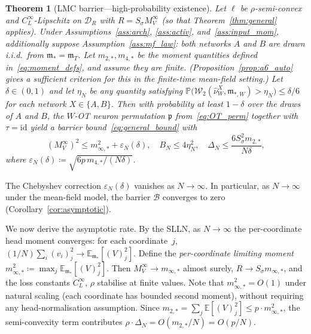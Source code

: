 \documentclass[11pt]{article}
\newtheorem{theorem}{Theorem}[section]
\newcommand{\E}{\mathbb{E}}
\newcommand{\Prob}{\mathbb{P}}
\newcommand{\cW}{\mathcal{W}}
\newcommand{\cB}{\mathcal{B}}
\newcommand{\cD}{\mathcal{D}}  %
\newcommand{\nperm}{\mathfrak{p}}  %
\begin{document}
\begin{theorem}[LMC barrier---high-probability existence]\label{thm:hp}
Let $\ell$ be $\rho$-semi-convex and $C_L^\infty$-Lipschitz on
$\cD_R$ with $R = S_\sigma M_V^\infty$ (so that
Theorem~\ref{thm:general} applies).
Under Assumptions~\ref{ass:arch}, \ref{ass:activ},
and~\ref{ass:input_mom}, additionally suppose
Assumption~\ref{ass:mf_law}: both networks $A$ and $B$ are
drawn i.i.d.\ from $\mathfrak{m}_* = \mathfrak{m}_T$.
Let $m_{2,*}, m_{4,*}$ be the moment quantities
defined in~\eqref{eq:moment_defs}, and assume they are finite.
(Proposition~\ref{prop:a6_auto} gives a sufficient criterion
for this in the finite-time mean-field setting.)
Let $\delta \in (0,1)$ and let $\eta_N$ be any quantity satisfying
$\Prob\!\bigl(\cW_2(\hat\nu_W^X, \mathfrak{m}_{*,W}) > \eta_N\bigr)
\le \delta/6$ for each network $X \in \{A,B\}$.
Then with probability at least $1-\delta$
over the draws of $A$ and $B$, the $W$-OT neuron permutation $\nperm$
from~\eqref{eq:OT_perm} together with $\tau = \mathrm{id}$
yield a barrier bound~\eqref{eq:general_bound} with
\begin{equation}\label{eq:head_moment}
  (M_V^\infty)^2 \le m_{\infty,*}^2 + \varepsilon_N(\delta), \quad
  B_N \le 4\eta_N^2, \quad
  \Delta_N \le \frac{6S_\sigma^2 m_{2,*}}{N\delta},
\end{equation}
where
$\varepsilon_N(\delta) \coloneqq \sqrt{6p\,m_{4,*}/(N\delta)}$.
\end{theorem}

The Chebyshev correction $\varepsilon_N(\delta)$ vanishes as $N\to\infty$.
In particular, as $N \to \infty$ under the mean-field model,
the barrier $\cB$ converges to zero (Corollary~\ref{cor:asymptotic}).

We now derive the asymptotic rate.\label{sec:asymptotic_rate}
By the SLLN, as $N\to\infty$ the per-coordinate head moment
converges: for each coordinate~$j$,
$(1/N)\sum_i (v_i)_j^2 \to \E_{\mathfrak{m}_*}[(V)_j^2]$.
Define the \emph{per-coordinate limiting moment}
$m_{\infty,*}^2 \coloneqq \max_j \E_{\mathfrak{m}_*}[(V)_j^2]$.
Then $M_V^\infty \to m_{\infty,*}$ almost surely,
$R \to S_\sigma m_{\infty,*}$, and the loss constants
$C_L^\infty$, $\rho$ stabilise at finite values.
Note that $m_{\infty,*}^2 = O(1)$ under natural scaling
(each coordinate has bounded second moment),
without requiring any head-normalisation assumption.
Since $m_{2,*} = \sum_j \E[(V)_j^2] \le p \cdot m_{\infty,*}^2$,
the semi-convexity term contributes
$\rho \cdot \Delta_N = O(m_{2,*}/N) = O(p/N)$.
\end{document}
